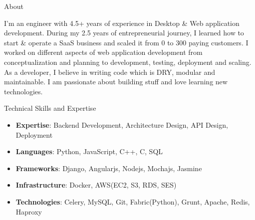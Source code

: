 \documentclass[]{mukeshcv}
\begin{document}
\thispagestyle{empty}


	\makeheader
	
	\begin{cvsection}{About}
		\begin{cvsubsection}{}{}{}
			I'm an engineer with 4.5+ years of experience in Desktop \& Web application development. During my 2.5 years of entrepreneurial journey, I learned how to start \& operate a SaaS business and scaled it from 0 to 300 paying customers. I worked on different aspects of web application development from conceptualization and planning to development, testing, deployment and scaling. As a developer, I believe in writing code which is DRY, modular and maintainable. I am passionate about building stuff and love learning new technologies.
		\end{cvsubsection}
	\end{cvsection}

	\begin{cvsection}{Technical Skills and Expertise}
		\begin{cvsubsection}{}{}{}	
			\begin{itemize}
				\item \textbf{Expertise}: Backend Development, Architecture Design, API Design, Deployment
				\item \textbf{Languages}: Python, JavaScript, C++, C, SQL
				\item \textbf{Frameworks}: Django, Angularjs, Nodejs, Mochajs, Jasmine
				\item \textbf{Infrastructure}: Docker, AWS(EC2, S3, RDS, SES)
				\item \textbf{Technologies}: Celery, MySQL, Git, Fabric(Python), Grunt, Apache, Redis, Haproxy

			\end{itemize}
		\end{cvsubsection}
	\end{cvsection}
\end{document}
